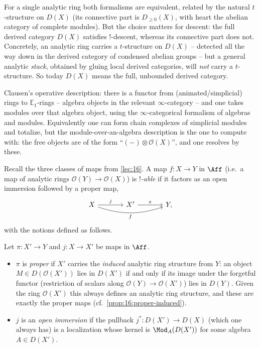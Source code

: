 \begin{remark}
\label{rmk:17:full-derived}
For a single analytic ring both formalisms are equivalent, related by the natural
$t$-structure on $D(X)$ (its connective part is $D_{\ge0}(X)$, with heart the abelian
category of complete modules). But the choice matters for descent: the full derived
category $D(X)$ satisfies $!$-descent, whereas its connective part does not. Concretely,
an analytic ring carries a $t$-structure on $D(X)$ -- detected all the way down in the
derived category of condensed abelian groups -- but a general analytic \emph{stack},
obtained by gluing local derived categories, will \emph{not} carry a $t$-structure. So
today $D(X)$ means the full, unbounded derived category.
\end{remark}

\begin{remark}
\label{rmk:17:working-D}
Clausen's operative description: there is a functor from (animated/simplicial) rings to
$\mathbb{E}_1$-rings -- algebra objects in the relevant $\infty$-category -- and one
takes modules over that algebra object, using the $\infty$-categorical formalism of
algebras and modules. Equivalently one can form chain complexes of simplicial modules
and totalize, but the module-over-an-algebra description is the one to compute with:
the free objects are of the form ``$(-)\otimes \mathcal O(X)$'', and one resolves by these.
\end{remark}

Recall the three classes of maps from \cref{lec:16}. A map $f\colon X\to Y$ in $\Aff$
(i.e.\ a map of analytic rings $\mathcal O(Y)\to\mathcal O(X)$) is \emph{$!$-able} if it
factors as an open immersion followed by a proper map,
\begin{equation}
\label{eq:17:shriekable-factorization}
\begin{tikzcd}[column sep=large]
X \arrow[r, "j"] \arrow[rr, bend right=18, "f"'] & X' \arrow[r, "\pi"] & Y,
\end{tikzcd}
\end{equation}
with the notions defined as follows.

\begin{definition}
\label{def:17:proper-open}
Let $\pi\colon X'\to Y$ and $j\colon X\to X'$ be maps in $\Aff$.
\begin{itemize}
\item $\pi$ is \emph{proper} if $X'$ carries the \emph{induced} analytic ring structure
from $Y$: an object $M\in D(\mathcal O(X'))$ lies in $D(X')$ if and only if its image
under the forgetful functor (restriction of scalars along $\mathcal O(Y)\to\mathcal O(X')$)
lies in $D(Y)$. Given the ring $\mathcal O(X')$ this always defines an analytic ring
structure, and these are exactly the proper maps (cf.\ \cref{prop:16:proper-induced}).
\item $j$ is an \emph{open immersion} if the pullback
$j^{*}\colon D(X')\to D(X)$ (which one always has) is a localization whose kernel is
$\Mod_{A}(D(X'))$ for some algebra $A\in D(X')$.
\end{itemize}
\end{definition}

